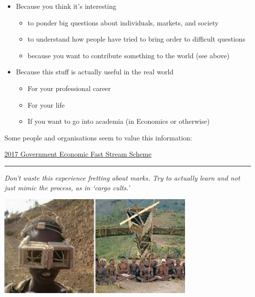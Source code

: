 \documentclass[]{article}
\providecommand{\tightlist}{%
  \setlength{\itemsep}{0pt}\setlength{\parskip}{0pt}}
\begin{document}
\begin{itemize}
\tightlist
\item
  Because you think it's interesting

  \begin{itemize}
  \tightlist
  \item
    to ponder big questions about individuals, markets, and society
  \item
    to understand how people have tried to bring order to difficult questions
  \item
    because you want to contribute something to the world (see above)
  \end{itemize}
\item
  Because this stuff is actually useful in the real world

  \begin{itemize}
  \tightlist
  \item
    For your professional career
  \item
    For your life
  \item
    If you want to go into academia (in Economics or otherwise)
  \end{itemize}
\end{itemize}

\bigskip

Some people and organisations seem to value this information:

\href{https://www.gov.uk/government/publications/2017-government-economic-fast-stream-scheme}{2017 Government Economic Fast Stream Scheme}

\begin{center}\rule{0.5\linewidth}{\linethickness}\end{center}

\emph{Don't waste this experience fretting about marks. Try to actually learn and not just mimic the process, as in `cargo cults.'}

\includegraphics[height=2in]{picsfigs/cargo-cults-336x175.png}
\end{document}
